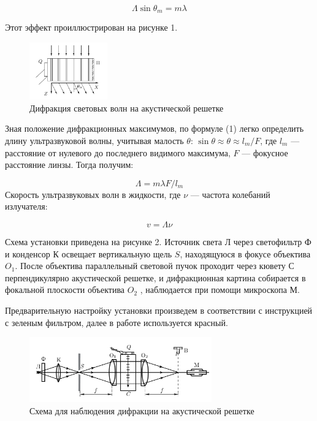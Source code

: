 \documentclass[a4paper,12pt]{article}
\begin{document}
\begin{equation}\label{}	
	\Lambda \sin \theta_m = m \lambda
\end{equation}

	Этот эффект проиллюстрирован на рисунке 1.
	\begin{figure}[h!]
		\centering	
		\includegraphics[width=0.3\textwidth]{difraction.png}
		\caption{Дифракция световых волн на акустической решетке}
		\label{diff}
	\end{figure}

	Зная положение дифракционных максимумов, по формуле (1) легко определить длину ультразвуковой волны, учитывая малость $ \theta $: $ \sin \theta \approx \theta \approx l_m /F  $, где $ l_m $ --- расстояние от нулевого до последнего видимого максимума, $ F $ --- фокусное расстояние линзы. Тогда получим:
	
	\begin{equation}\label{}
	 \Lambda = m \lambda F/ l_m 
	\end{equation}
	Скорость ультразвуковых волн в жидкости, где $ \nu $ --- частота колебаний излучателя:
	
\begin{equation}\label{}
	v = \Lambda \nu 
\end{equation}

Схема установки приведена на рисунке 2. Источник света Л через светофильтр Ф и конденсор К освещает вертикальную щель $ S $, находящуюся в фокусе объектива $ O_1 $. После объектива параллельный световой пучок проходит через кювету С перпендикулярно акустической решетке, и дифракционная картина собирается в фокальной плоскости объектива $ O_2 $ , наблюдается при помощи микроскопа М.

Предварительную настройку установки произведем в соответствии с инструкцией с зеленым фильтром, далее в работе используется красный.

	\begin{figure}[!h]
	\centering	
	\includegraphics[width=0.7\textwidth]{shema1.png}
	\caption{Схема для наблюдения дифракции на акустической решетке}
	\label{shema1}
\end{figure}
\end{document}
